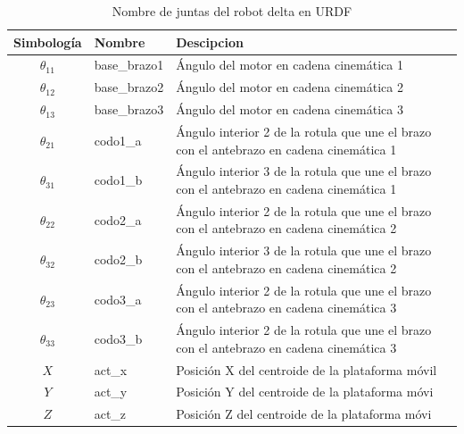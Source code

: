         \begingroup
            \renewcommand{\arraystretch}{2.0}
            \begin{table}[H]
                \centering
                \begin{tabular}{c m{2.5cm} m{8cm}}
                   \hline                   
                   \textbf{Simbología}  &  \textbf{Nombre}  & \textbf{Descipcion}    \\\hline \hline 
                   $\theta_{11}$  & base\_brazo1    & Ángulo del motor en cadena cinemática 1                       \\\hline
                   $\theta_{12}$  & base\_brazo2    & Ángulo del motor en cadena cinemática 2                            \\\hline
                   $\theta_{13}$  & base\_brazo3    & Ángulo del motor en cadena cinemática 3                            \\\hline
                   $\theta_{21}$  & codo1\_a    & Ángulo interior 2 de la rotula que une el brazo con el antebrazo en cadena cinemática 1                       \\\hline
                   $\theta_{31}$  & codo1\_b    & Ángulo interior 3 de la rotula que une el brazo con el antebrazo en cadena cinemática 1                       \\\hline
                   $\theta_{22}$  & codo2\_a    & Ángulo interior 2 de la rotula que une el brazo con el antebrazo en cadena cinemática 2                       \\\hline
                   $\theta_{32}$  & codo2\_b    & Ángulo interior 3 de la rotula que une el brazo con el antebrazo en cadena cinemática 2                       \\\hline
                   $\theta_{23}$  & codo3\_a    & Ángulo interior 2 de la rotula que une el brazo con el antebrazo en cadena cinemática 3                       \\\hline
                   $\theta_{33}$  & codo3\_b    & Ángulo interior 2 de la rotula que une el brazo con el antebrazo en cadena cinemática 3                       \\\hline
                   $X$  & act\_x    & Posición X del centroide de la plataforma móvil                       \\\hline
                   $Y$  & act\_y    & Posición Y del centroide de la plataforma móvi                       \\\hline
                   $Z$  & act\_z    & Posición Z del centroide de la plataforma móvi                       \\\hline                  

                \end{tabular}
                \caption{Nombre de juntas del robot delta en URDF}
                \label{tab:cap6_rviz_1}
            \end{table}
        \endgroup

